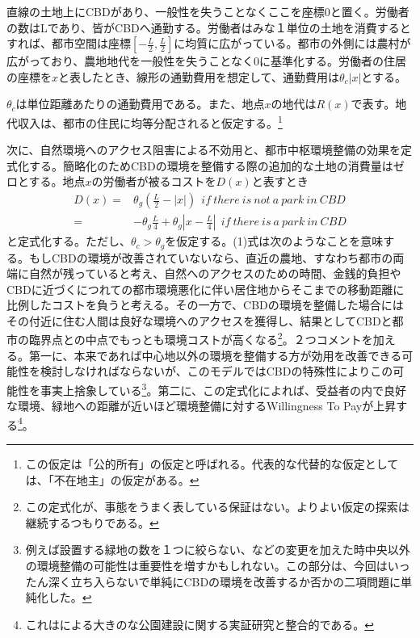 \documentclass[a4paper]{jarticle}
\begin{document}
直線の土地上にCBDがあり、一般性を失うことなくここを座標0と置く。労働者の数はLであり、皆がCBDへ通勤する。労働者はみな１単位の土地を消費するとすれば、都市空間は座標$[-\frac{L}{2}, \frac{L}{2}]$に均質に広がっている。都市の外側には農村が広がっており、農地地代を一般性を失うことなく0に基準化する。労働者の住居の座標を$x$と表したとき、線形の通勤費用を想定して、通勤費用は$\theta_c |x|$とする。

$\theta_c$は単位距離あたりの通勤費用である。また、地点$x$の地代は$R(x)$で表す。地代収入は、都市の住民に均等分配されると仮定する。\footnote{この仮定は「公的所有」の仮定と呼ばれる。代表的な代替的な仮定としては、「不在地主」の仮定がある。}

次に、自然環境へのアクセス阻害による不効用と、都市中枢環境整備の効果を定式化する。簡略化のためCBDの環境を整備する際の追加的な土地の消費量はゼロとする。地点$x$の労働者が被るコストを$D(x)$と表すとき
\begin{equation}
  \begin{split}
  D(x) = & \theta_g (\frac{L}{2} - |x|) \ \ if\ there\ is\ not\ a\ park\ in\ CBD \\
         = &- \theta_g \frac{L}{4} + \theta_g |x - \frac{L}{4}| \ \ if\ there\ is\ a\ park\ in\ CBD
  \end{split}
\end{equation}
と定式化する。ただし、$\theta_c > \theta_g$を仮定する。(1)式は次のようなことを意味する。もしCBDの環境が改善されていないなら、直近の農地、すなわち都市の両端に自然が残っていると考え、自然へのアクセスのための時間、金銭的負担やCBDに近づくにつれての都市環境悪化に伴い居住地からそこまでの移動距離に比例したコストを負うと考える。その一方で、CBDの環境を整備した場合にはその付近に住む人間は良好な環境へのアクセスを獲得し、結果としてCBDと都市の臨界点との中点でもっとも環境コストが高くなる\footnote{この定式化が、事態をうまく表している保証はない。よりよい仮定の探索は継続するつもりである。}。２つコメントを加える。第一に、本来であれば中心地以外の環境を整備する方が効用を改善できる可能性を検討しなければならないが、このモデルではCBDの特殊性によりこの可能性を事実上捨象している\footnote{例えば設置する緑地の数を１つに絞らない、などの変更を加えた時中央以外の環境整備の可能性は重要性を増すかもしれない。この部分は、今回はいったん深く立ち入らないで単純にCBDの環境を改善するか否かの二項問題に単純化した。}。第二に、この定式化によれば、受益者の内で良好な環境、緑地への距離が近いほど環境整備に対するWillingness To Payが上昇する\footnote{これは\citet{salazar07:esti}による大きのな公園建設に関する実証研究と整合的である。}。
\end{document}
